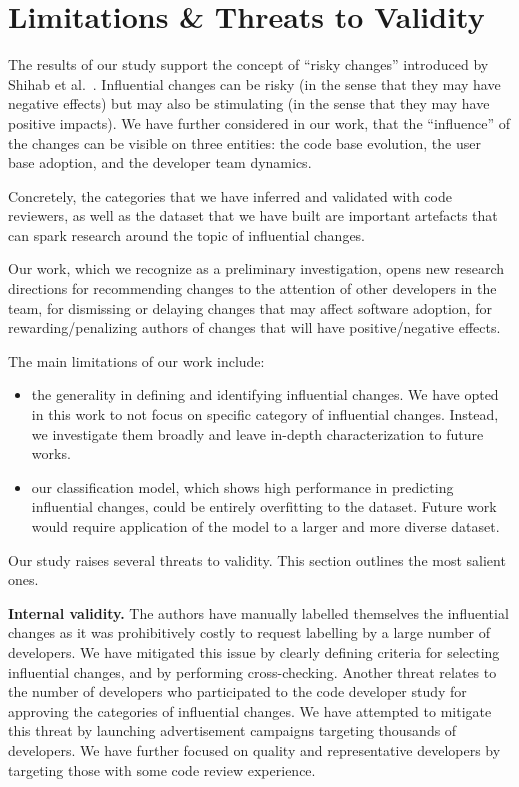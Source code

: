 \section{Limitations \& Threats to Validity}
\label{sec:discussion}

The results of our study support the concept of ``risky changes'' introduced by Shihab et al.~\cite{shihab_industrial_2012}.
Influential changes can be risky (in the sense that they may have negative effects) but may also be stimulating (in the sense that
they may have positive impacts). We have further considered in our work, that the ``influence'' of the changes can be
visible on three entities: the code base evolution, the user base adoption, and the developer team dynamics.

Concretely, the categories that we have inferred and validated with code reviewers, as well as the dataset that
we have built are important artefacts that can spark research around the topic of influential changes.

Our work, which we recognize as a preliminary investigation, opens new research directions for
recommending changes to the attention of other developers in the team, for dismissing or delaying changes that may
affect software adoption, for rewarding/penalizing authors of changes that will have positive/negative effects.

The main limitations of our work include:
\begin{itemize}
	\item the generality in defining and identifying influential changes. We have opted in this work to not focus on specific category of influential changes. Instead, we investigate them broadly and leave in-depth characterization to future works.
	\item our classification model, which shows high performance in predicting influential changes, could be entirely overfitting to  the dataset. Future work would require application of the model to a larger and more diverse dataset.
\end{itemize}

Our study raises several threats to validity. This section outlines the most salient ones.

\textbf{Internal validity.} The authors have manually labelled themselves the influential changes as it
was prohibitively costly to request labelling by a large number of developers. We have mitigated this issue
by clearly defining criteria for selecting influential changes, and by performing cross-checking.
Another threat relates to the number of developers who participated to the code developer study for
approving the categories of influential changes. We have attempted to mitigate this threat by launching
advertisement campaigns targeting thousands of developers. We have further focused on quality and representative 
developers by targeting those with some code review experience.

